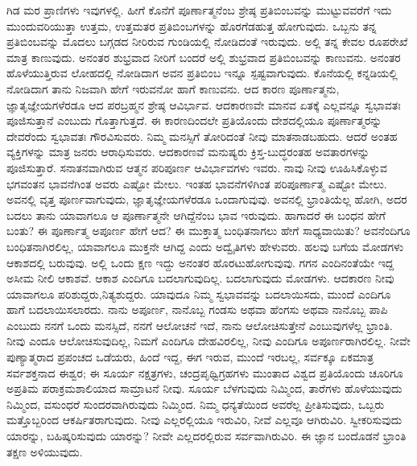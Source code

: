 ಗಿಡ ಮರ ಪ್ರಾಣಿಗಳು ಇವುಗಳಲ್ಲಿ. ಹೀಗೆ ಕೊನೆಗೆ ಪೂರ್ಣಾತ್ಮನೆಂಬ ಶ್ರೇಷ್ಠ ಪ್ರತಿಬಿಂಬವನ್ನು ಮುಟ್ಟುವವರೆಗೆ ಇದು ಮುಂದುವರಿಯುತ್ತಾ ಉತ್ತಮ, ಉತ್ತಮತರ ಪ್ರತಿಬಿಂಬಗಳನ್ನು ಹೊರಗೆಡಹುತ್ತ ಹೋಗುವುದು. ಒಬ್ಬನು ತನ್ನ ಪ್ರತಿಬಿಂಬವನ್ನು ಮೊದಲು ಬಗ್ಗಡದ ನೀರಿರುವ ಗುಂಡಿಯಲ್ಲಿ ನೋಡಿದಂತೆ ಇರುವುದು. ಅಲ್ಲಿ ತನ್ನ ಕೇವಲ ರೂಪರೇಖೆ ಮಾತ್ರ ಕಾಣುವುದು. ಅನಂತರ ಶುಭ್ರವಾದ ನೀರಿಗೆ ಬಂದರೆ ಅಲ್ಲಿ ಶುಭ್ರವಾದ ಪ್ರತಿಬಿಂಬವನ್ನು ಕಾಣುವನು. ಅನಂತರ ಹೊಳೆಯುತ್ತಿರುವ ಲೋಹದಲ್ಲಿ ನೋಡಿದಾಗ ಅವನ ಪ್ರತಿಬಿಂಬ ಇನ್ನೂ ಸ್ಪಷ್ಟವಾಗುವುದು. ಕೊನೆಯಲ್ಲಿ ಕನ್ನಡಿಯಲ್ಲಿ ನೋಡಿದಾಗ ತಾನು ನಿಜವಾಗಿ ಹೇಗೆ ಇರುವನೋ ಹಾಗೆ ಕಾಣುವನು. ಆದ ಕಾರಣ ಪೂರ್ಣಾತ್ಮನು, ಜ್ಞಾತೃಜ್ಞೇಯಗಳೆರಡೂ ಆದ ಪರಬ್ರಹ್ಮನ ಶ್ರೇಷ್ಠ ಆವಿರ್ಭಾವ. ಆದಕಾರಣವೇ ಮಾನವ ಏತಕ್ಕೆ ಎಲ್ಲವನ್ನೂ ಸ್ವಭಾವತಃ ಪೂಜಿಸುತ್ತಾನೆ ಎಂಬುದು ಗೊತ್ತಾಗುತ್ತದೆ. ಈ ಕಾರಣದಿಂದಲೇ ಪ್ರತಿಯೊಂದು ದೇಶದಲ್ಲಿಯೂ ಪೂರ್ಣಾತ್ಮರನ್ನು ದೇವರೆಂದು ಸ್ವಭಾವತಃ ಗೌರವಿಸುವರು. ನಿಮ್ಮ ಮನಸ್ಸಿಗೆ ತೋರಿದಂತೆ ನೀವು ಮಾತನಾಡಬಹುದು. ಆದರೆ ಅಂತಹ ವ್ಯಕ್ತಿಗಳನ್ನು ಮಾತ್ರ ಜನರು ಆರಾಧಿಸುವರು. ಆದಕಾರಣವೆ ಮನುಷ್ಯರು ಕ್ರಿಸ್ತ-ಬುದ್ಧರಂತಹ ಅವತಾರಗಳನ್ನು ಪೂಜಿಸುತ್ತಾರೆ. ಸನಾತನವಾಗಿರುವ ಆತ್ಮನ ಪರಿಪೂರ್ಣ ಆವಿರ್ಭಾವಗಳು ಇವರು. ನಾವು ನೀವು ಊಹಿಸಿಕೊಳ್ಳುವ ಭಗವಂತನ ಭಾವನೆಗಿಂತ ಅವರು ಎಷ್ಟೋ ಮೇಲು. ಇಂತಹ ಭಾವನೆಗಳಿಗಿಂತ ಪರಿಪೂರ್ಣಾತ್ಮ ಎಷ್ಟೋ ಮೇಲು. ಅವನಲ್ಲಿ ವೃತ್ತ ಪೂರ್ಣವಾಗುವುದು, ಜ್ಞಾತೃಜ್ಞೇಯಗಳೆರಡೂ ಒಂದಾಗುವುವು. ಅವನಲ್ಲಿ ಭ್ರಾಂತಿಯೆಲ್ಲ ಹೋಗಿ, ಅದರ ಬದಲು ತಾನು ಯಾವಾಗಲೂ ಆ ಪೂರ್ಣಾತ್ಮನೇ ಆಗಿದ್ದೆನೆಂಬ ಭಾವ ಇರುವುದು. ಹಾಗಾದರೆ ಈ ಬಂಧನ ಹೇಗೆ ಬಂತು? ಈ ಪೂರ್ಣಾತ್ಮ ಅಪೂರ್ಣ ಹೇಗೆ ಆದ? ಈ ಮುಕ್ತಾತ್ಮ ಬಂಧಿತನಾಗಲು ಹೇಗೆ ಸಾಧ್ಯವಾಯಿತು? ಅವನೆಂದಿಗೂ ಬಂಧಿತನಾಗಿರಲಿಲ್ಲ, ಯಾವಾಗಲೂ ಮುಕ್ತನೇ ಆಗಿದ್ದ ಎಂದು ಅದ್ವೈತಿಗಳು ಹೇಳುವರು. ಹಲವು ಬಗೆಯ ಮೋಡಗಳು ಆಕಾಶದಲ್ಲಿ ಬರುವುವು. ಅಲ್ಲಿ ಒಂದು ಕ್ಷಣ ಇದ್ದು ಅನಂತರ ಹೊರಟುಹೋಗುವುವು. ಗಗನ ಎಂದಿನಂತೆಯೇ ಇದ್ದ ಅಸೀಮ ನೀಲಿ ಆಕಾಶವೆ. ಆಕಾಶ ಎಂದಿಗೂ ಬದಲಾಗುವುದಿಲ್ಲ. ಬದಲಾಗುವುದು ಮೋಡಗಳು. ಆದಕಾರಣ ನೀವು ಯಾವಾಗಲೂ ಪರಿಶುದ್ದರು,\break ನಿತ್ಯಶುದ್ದರು. ಯಾವುದೂ ನಿಮ್ಮ ಸ್ವಭಾವವನ್ನು ಬದಲಾಯಿಸದು, ಮುಂದೆ ಎಂದಿಗೂ ಹಾಗೆ ಬದಲಾಯಿಸಲಾರದು. ನಾನು ಅಪೂರ್ಣ, ನಾನೊಬ್ಬ ಗಂಡಸು ಅಥವಾ ಹೆಂಗಸು ಅಥವಾ ನಾನೊಬ್ಬ ಪಾಪಿ ಎಂಬುದು ನನಗೆ ಒಂದು ಮನಸ್ಸಿದೆ, ನನಗೆ ಆಲೋಚನೆ ಇದೆ, ನಾನು ಆಲೋಚಿಸುತ್ತೇನೆ ಎಂಬುವುಗಳೆಲ್ಲ ಭ್ರಾಂತಿ. ನೀವು ಎಂದೂ ಆಲೋಚಿಸುವುದಿಲ್ಲ, ನಿಮಗೆ ಎಂದಿಗೂ ದೇಹವಿರಲಿಲ್ಲ, ನೀವು ಎಂದಿಗೂ ಅಪೂರ್ಣರಾಗಿರಲಿಲ್ಲ. ನೀವೇ ಪುಣ್ಯಾತ್ಮರಾದ ಪ್ರಪಂಚದ ಒಡೆಯರು, ಹಿಂದೆ ಇದ್ದ, ಈಗ ಇರುವ, ಮುಂದೆ ಇರಬಲ್ಲ, ಸರ್ವಕ್ಕೂ ಏಕಮಾತ್ರ ಸರ್ವಶಕ್ತನಾದ ಈಶ್ವರ; ಈ ಸೂರ್ಯ ನಕ್ಷತ್ರಗಳು, ಚಂದ್ರಪೃಥ್ವಿಗ್ರಹಗಳು ಮುಂತಾದ ವಿಶ್ವದ ಪ್ರತಿಯೊಂದು ಚೂರಿಗೂ ಅಪ್ರತಿಮ ಪರಾಕ್ರಮಶಾಲಿಯಾದ ಸಾಮ್ರಾಟನೆ ನೀವು. ಸೂರ್ಯ ಬೆಳಗುವುದು ನಿಮ್ಮಿಂದ, ತಾರೆಗಳು ಹೊಳೆಯುವುದು ನಿಮ್ಮಿಂದ, ವಸುಂಧರೆ ಸುಂದರವಾಗಿರುವುದು ನಿಮ್ಮಿಂದ. ನಿಮ್ಮ ಧನ್ಯತೆಯಿಂದ ಅವರೆಲ್ಲ ಪ್ರೀತಿಸುವುದು, ಒಬ್ಬರು ಮತ್ತೊಬ್ಬರಿಂದ ಆಕರ್ಷಿತರಾಗುವುದು. ನೀವು ಎಲ್ಲರಲ್ಲಿಯೂ ಇರುವಿರಿ, ನೀವೆ ಎಲ್ಲವೂ ಆಗಿರುವಿರಿ. ಸ್ವೀಕರಿಸುವುದು ಯಾರನ್ನು, ಬಹಿಷ್ಕರಿಸುವುದು ಯಾರನ್ನು? ನೀವೇ ಎಲ್ಲದರಲ್ಲಿರುವ ಸರ್ವವಾಗಿರುವಿರಿ. ಈ ಜ್ಞಾನ ಬಂದೊಡನೆ ಭ್ರಾಂತಿ ತಕ್ಷಣ ಅಳಿಯುವುದು.

